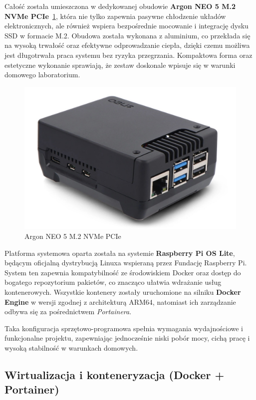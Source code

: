 \documentclass[
    left=2.5cm,         %
    right=2.5cm,        %
    top=2.5cm,          %
    bottom=3cm,         %
    bindingoffset=6mm,  %
    nohyphenation=true %
]{eiti/eiti-thesis} %
\begin{document}
Całość została umieszczona w dedykowanej obudowie \textbf{Argon NEO 5 M.2 NVMe PCIe}~\ref{fig:argon-neo}, która nie tylko zapewnia pasywne chłodzenie układów elektronicznych, ale również wspiera bezpośrednie mocowanie i integrację dysku SSD w formacie M.2. Obudowa została wykonana z aluminium, co przekłada się na wysoką trwałość oraz efektywne odprowadzanie ciepła, dzięki czemu możliwa jest długotrwała praca systemu bez ryzyka przegrzania. Kompaktowa forma oraz estetyczne wykonanie sprawiają, że zestaw doskonale wpisuje się w warunki domowego laboratorium.

\begin{figure}[H]
    \centering
    \includegraphics[width=\textwidth]{img/argon_neo.png}
    \caption{Argon NEO 5 M.2 NVMe PCIe}
    \label{fig:argon-neo}
\end{figure}

Platforma systemowa oparta została na systemie \textbf{Raspberry Pi OS Lite}\cite{raspberry-os}, będącym oficjalną dystrybucją Linuxa wspieraną przez Fundację Raspberry Pi. System ten zapewnia kompatybilność ze środowiskiem Docker oraz dostęp do bogatego repozytorium pakietów, co znacząco ułatwia wdrażanie usług kontenerowych. Wszystkie kontenery zostały uruchomione na silniku \textbf{Docker Engine} w wersji zgodnej z architekturą ARM64, natomiast ich zarządzanie odbywa się za pośrednictwem \textit{Portainera}.

Taka konfiguracja sprzętowo-programowa spełnia wymagania wydajnościowe i funkcjonalne projektu, zapewniając jednocześnie niski pobór mocy, cichą pracę i wysoką stabilność w warunkach domowych.

\subsection{Wirtualizacja i konteneryzacja (Docker + Portainer)}
\end{document}
